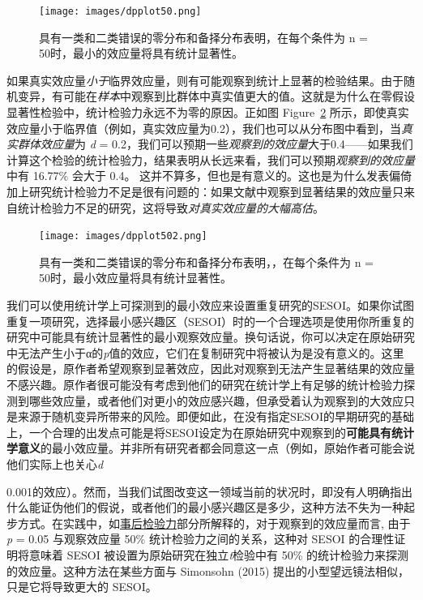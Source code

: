 \documentclass[
  letterpaper,
  DIV=11,
  numbers=noendperiod]{scrreprt}
\begin{document}
\begin{figure}

{\centering \texttt{[image: images/dpplot50.png]}

}

\caption{\label{fig-distpowerplot1}具有一类和二类错误的零分布和备择分布表明，在每个条件为
n = 50时，最小的效应量将具有统计显著性。}

\end{figure}

如果真实效应量\emph{小于}临界效应量，则有可能观察到统计上显著的检验结果。由于随机变异，有可能在\emph{样本}中观察到比群体中真实值更大的值。这就是为什么在零假设显著性检验中，统计检验力永远不为零的原因。正如图
Figure~\ref{fig-distpowerplot2}
所示，即使真实效应量小于临界值（例如，真实效应量为0.2），我们也可以从分布图中看到，当\emph{真实群体效应量}为
\emph{d} =
0.2，我们可以预期一些\emph{观察到的效应量}大于0.4------如果我们计算这个检验的统计检验力，结果表明从长远来看，我们可以预期\emph{观察到的效应量}中有
16.77\% 会大于 0.4。
这并不算多，但也是有意义的。这也是为什么发表偏倚加上研究统计检验力不足是很有问题的：如果文献中观察到显著结果的效应量只来自统计检验力不足的研究，这将导致\emph{对真实效应量的大幅高估}。

\begin{figure}

{\centering \texttt{[image: images/dpplot502.png]}

}

\caption{\label{fig-distpowerplot2}具有一类和二类错误的零分布和备择分布表明，，在每个条件为
n = 50时，最小效应量将具有统计显著性。}

\end{figure}

我们可以使用统计学上可探测到的最小效应来设置重复研究的SESOI。如果你试图重复一项研究，选择最小感兴趣区（SESOI）时的一个合理选项是使用你所重复的研究中可能具有统计显著性的最小观察效应量。换句话说，你可以决定在原始研究中无法产生小于α的\emph{p}值的效应，它们在复制研究中将被认为是没有意义的。这里的假设是，原作者希望观察到显著效应，因此对观察到无法产生显著结果的效应量不感兴趣。原作者很可能没有考虑到他们的研究在统计学上有足够的统计检验力探测到哪些效应量，或者他们对更小的效应感兴趣，但承受着认为观察到的大效应只是来源于随机变异所带来的风险。即便如此，在没有指定SESOI的早期研究的基础上，一个合理的出发点可能是将SESOI设定为在原始研究中观察到的\textbf{可能具有统计学意义}的最小效应量。并非所有研究者都会同意这一点（例如，原始作者可能会说他们实际上也关心\emph{d}

0.001的效应）。然而，当我们试图改变这一领域当前的状况时，即没有人明确指出什么能证伪他们的假说，或者他们的最小感兴趣区是多少，这种方法不失为一种起步方式。在实践中，如\protect\hyperlink{posthoc}{事后检验力}部分所解释的，对于观察到的效应量而言,
由于\emph{p} = 0.05 与观察效应量 50\% 统计检验力之间的关系，这种对 SESOI
的合理性证明将意味着 SESOI 被设置为原始研究在独立\emph{t}检验中有 50\%
的统计检验力来探测的效应量。这种方法在某些方面与 Simonsohn (2015)
提出的小型望远镜法相似，只是它将导致更大的 SESOI。
\end{document}

